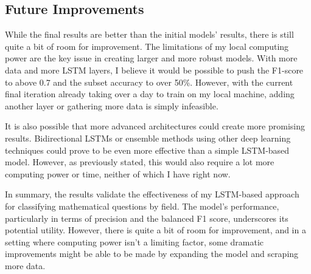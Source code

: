 \documentclass[12pt, letterpaper]{article}
\begin{document}
\subsection{Future Improvements}
While the final results are better than the initial models' results, there is still quite a bit of room for improvement. The limitations of my local computing power are the key issue in creating larger and more robust models. With more data and more LSTM layers, I believe it would be possible to push the F1-score to above 0.7 and the subset accuracy to over 50\%. However, with the current final iteration already taking over a day to train on my local machine, adding another layer or gathering more data is simply infeasible.
\par It is also possible that more advanced architectures could create more promising results. Bidirectional LSTMs or ensemble methods using other deep learning techniques could prove to be even more effective than a simple LSTM-based model. However, as previously stated, this would also require a lot more computing power or time, neither of which I have right now.
\par In summary, the results validate the effectiveness of my LSTM-based approach for classifying mathematical questions by field. The model's performance, particularly in terms of precision and the balanced F1 score, underscores its potential utility. However, there is quite a bit of room for improvement, and in a setting where computing power isn't a limiting factor, some dramatic improvements might be able to be made by expanding the model and scraping more data. 
\end{document}
